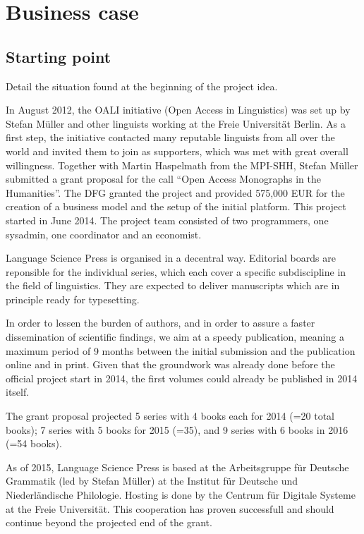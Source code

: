 \documentclass[nonflat,smallfont
]{langsci/langscibook}
\newcommand{\background}[1]{ 
  \vspace{5mm}
  \renewcommand{\tblslinecolour}{lsDarkBlue}
  \tblssy[red]{explore2}{Background}{\vspace*{-5mm}#1}
}
\newcommand{\langscisolution}[1]{
  \renewcommand{\tblslinecolour}{lsLightBlue}
  \tblssy{langsci}{LangSci solution}{\vspace*{-5mm}#1}
}
\renewcommand{\tblssy}[4][black!12]{%
  \renewcommand{\langscisymbol}{#2}\renewcommand{\tblsboxcolor}{#1}
  \begin{mdframed}[style=yellowexercise,frametitle={#3}]
    #4
  \end{mdframed}
}
\begin{document}
\chapter{Business case}
\section{Starting point}
\background{
Detail the situation found at the beginning of the project idea. 

}
\langscisolution{
In August 2012, the OALI initiative (Open Access in Linguistics) was set up by Stefan Müller and other linguists working at the Freie Universität Berlin. As a first step, the initiative contacted many reputable linguists from all over the world and invited them to join as supporters, which was met with great overall willingness. Together with Martin Haspelmath from the MPI-SHH, Stefan Müller submitted a grant proposal for the call  ``Open Access Monographs in the Humanities''. 
The DFG granted the project and provided 575,000 EUR for the creation of a business model and the setup of the initial platform. 
This project started in June 2014. The project team consisted of two programmers, one sysadmin, one coordinator and an economist. 

Language Science Press is organised in a decentral way. Editorial boards are reponsible for the individual series, which each cover a specific subdiscipline in the field of linguistics.  They are expected to deliver manuscripts which are in principle ready for typesetting. 

In order to lessen the burden of authors, and in order to assure a faster dissemination of scientific findings, we aim at a speedy publication, meaning a maximum period of 9 months between the initial submission and the publication online and in print. Given that the groundwork was already done before the official project start in 2014, the first volumes could already be published in 2014 itself. 

The grant proposal projected 5 series with 4 books each for 2014 (=20 total books); 7 series with 5 books for 2015 (=35), and 9 series with 6 books in 2016 (=54 books). 
 
As of 2015, Language Science Press is based at the Arbeitsgruppe für Deutsche Grammatik (led by Stefan Müller) at the Institut für Deutsche und Niederländische Philologie. Hosting is done by the Centrum für Digitale Systeme at the Freie Universität. This cooperation has proven successfull and should continue beyond the projected end of the grant.
}
\end{document}

